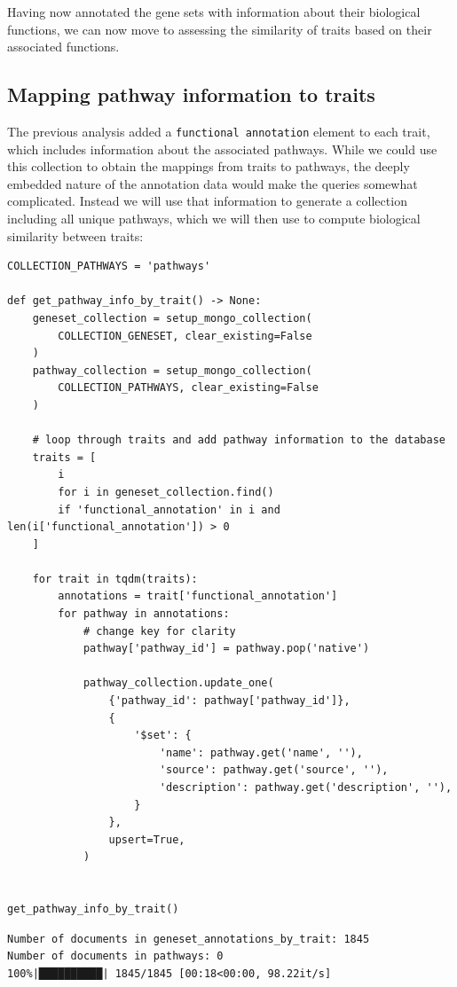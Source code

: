 Having now annotated the gene sets with information about their biological functions, we can now move to assessing the similarity of traits based on their associated functions.

\subsection{Mapping pathway information to traits}

The previous analysis added a \texttt{functional annotation} element to each trait, which includes information about the associated pathways. While we could use this collection to obtain the mappings from traits to pathways, the deeply embedded nature of the annotation data would make the queries somewhat complicated.  Instead we will use that information to generate a collection including all unique pathways, which we will then use to compute biological similarity between traits:

\begin{lstlisting}[style=Python]
COLLECTION_PATHWAYS = 'pathways'

def get_pathway_info_by_trait() -> None:
    geneset_collection = setup_mongo_collection(
        COLLECTION_GENESET, clear_existing=False
    )
    pathway_collection = setup_mongo_collection(
        COLLECTION_PATHWAYS, clear_existing=False
    )

    # loop through traits and add pathway information to the database
    traits = [
        i
        for i in geneset_collection.find()
        if 'functional_annotation' in i and len(i['functional_annotation']) > 0
    ]

    for trait in tqdm(traits):
        annotations = trait['functional_annotation']
        for pathway in annotations:
            # change key for clarity
            pathway['pathway_id'] = pathway.pop('native')

            pathway_collection.update_one(
                {'pathway_id': pathway['pathway_id']},
                {
                    '$set': {
                        'name': pathway.get('name', ''),
                        'source': pathway.get('source', ''),
                        'description': pathway.get('description', ''),
                    }
                },
                upsert=True,
            )


get_pathway_info_by_trait()
\end{lstlisting}

\begin{lstlisting}[style=shell, numbers=none]
Number of documents in geneset_annotations_by_trait: 1845
Number of documents in pathways: 0
100%|██████████| 1845/1845 [00:18<00:00, 98.22it/s]
\end{lstlisting}

